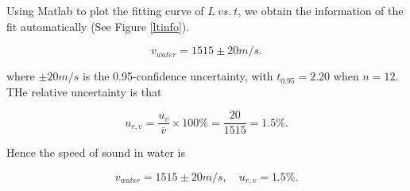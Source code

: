 Using Matlab to plot the fitting curve of $L\ vs.\ t$, we obtain the
information of the fit automatically (See Figure \ref{ltinfo}).  

\[
    v_{water}=1515\pm20 m/s. 
\]

where $\pm 20m/s$ is the 0.95-confidence uncertainty, with $t_{0.95}=2.20$
when $n=12$. THe relative uncertainty is that 

\[
    u_{r,v}=\frac{u_v}{\bar{v}}\times100\%=\frac{20}{1515}=1.5\%. 
\]

Hence the speed of sound in water is 

\[
    v_{water}=1515\pm20m/s,\quad u_{r,v}=1.5\%. 
\]